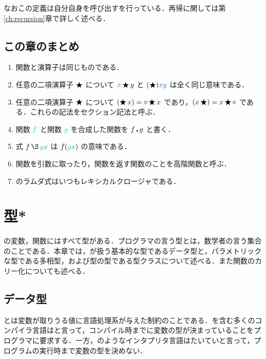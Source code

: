 \documentclass[a5paper,twoside,fleqn,draft]{jsbook}
\begin{document}
なおこの定義は自分自身を呼び出すを行っている．再帰に関しては第\ref{ch:recursion}章で詳しく述べる．

\section{この章のまとめ}

\begin{enumerate}
\item 関数と演算子は同じものである．
\item 任意の二項演算子 $\operatorname{\bigstar}$ について $\hVar{x}\hAnyBinOp y$ と $(\hAnyBinOp)\hVar{x}\hVar{y}$ は全く同じ意味である．
\item 任意の二項演算子 $\operatorname{\bigstar}$ について $(\operatorname{\bigstar} x)=\diamond\operatorname{\bigstar} x$ であり，$(x\operatorname{\bigstar})=x\operatorname{\bigstar}\diamond$ である．これらの記法をセクション記法と呼ぶ．
\item 関数 $\hFunc{f}$ と関数 $\hFunc{g}$ を合成した関数を $f\operatorname{\centerdot} g$ と書く．
\item 式 $f\hApply \hFunc{g}\hVar{x}$ は $f(\hFunc{g}\hVar{x})$ の意味である．
\item 関数を引数に取ったり，関数を返す関数のことを高階関数と呼ぶ．
\item \haskell のラムダ式はいつもレキシカルクロージャである．
\end{enumerate}

\chapter{型*}
\label{ch:type}

\begin{leader}
\haskell の変数，関数にはすべて型がある．プログラマの言う型とは，数学者の言う集合のことである．本章では，\haskell が扱う基本的な型であるデータ型と，パラメトリックな型である多相型，および型の型である型クラスについて述べる．また関数のカリー化についても述べる．
\end{leader}

\section{データ型}

とは変数が取りうる値に言語処理系が与えた制約のことである．\haskell を含む多くのコンパイラ言語はと言って，コンパイル時までに変数の型が決まっていることをプログラマに要求する．一方，\python のようなインタプリタ言語はたいていと言って，プログラムの実行時まで変数の型を決めない．
\end{document}
